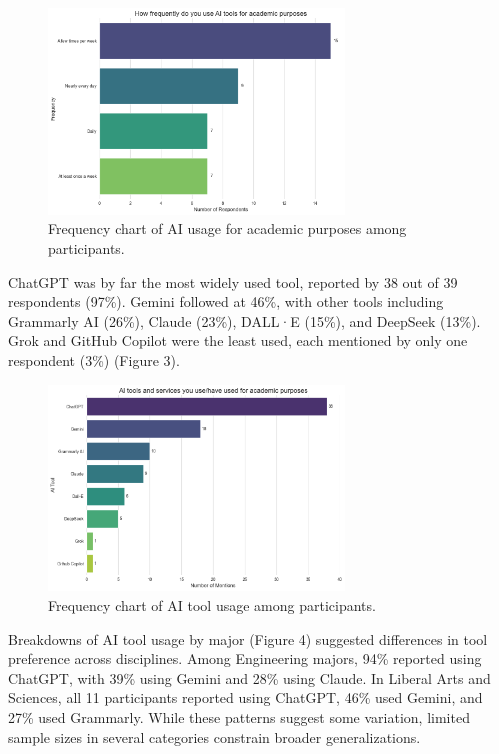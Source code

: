 \documentclass[12pt]{article}
\begin{document}
\begin{figure}[htbp]
  \centering
  \includegraphics[width=0.7\textwidth]{fig2.png} %
  \caption{Frequency chart of AI usage for academic purposes among participants.}
  \label{fig:example1}
\end{figure}

ChatGPT was by far the most widely used tool, reported by 38 out of 39 respondents (97\%). Gemini followed at 46\%, with other tools including Grammarly AI (26\%), Claude (23\%), DALL·E (15\%), and DeepSeek (13\%). Grok and GitHub Copilot were the least used, each mentioned by only one respondent (3\%) (Figure 3).

\begin{figure}[htbp]
  \centering
  \includegraphics[width=0.7\textwidth]{fig3.png} %
  \caption{Frequency chart of AI tool usage among participants.}
  \label{fig:example1}
\end{figure}

Breakdowns of AI tool usage by major (Figure 4) suggested differences in tool preference across disciplines. Among Engineering majors, 94\% reported using ChatGPT, with 39\% using Gemini and 28\% using Claude. In Liberal Arts and Sciences, all 11 participants reported using ChatGPT, 46\% used Gemini, and 27\% used Grammarly. While these patterns suggest some variation, limited sample sizes in several categories constrain broader generalizations.
\end{document}
